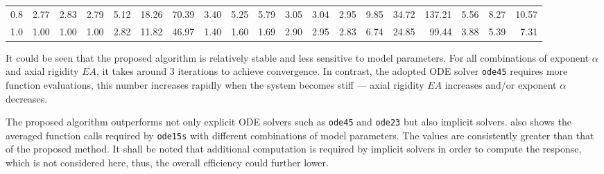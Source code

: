 \begin{table}[ht]
\begin{tabular}{rrrr|rrr|rrr|rrr|rrr|rrr}
                         0.8 &                                 2.77 &                                 2.83 &                                 2.79 &                                 5.12 &                                18.26 &                                70.39 &                                 3.40 &                                 5.25 &                                 5.79 &                                 3.05 &                                 3.04 &                                 2.95 &                                 9.85 &                                34.72 &                               137.21 &                                 5.56 &                                 8.27 &                                10.57 \\
                         1.0 &                                 1.00 &                                 1.00 &                                 1.00 &                                 2.82 &                                11.82 &                                46.97 &                                 1.40 &                                 1.60 &                                 1.69 &                                 2.90 &                                 2.95 &                                 2.83 &                                 6.74 &                                24.85 &                                99.44 &                                 3.88 &                                 5.39 &                                 7.31 \\ \bottomrule
\end{tabular}
\end{table}
It could be seen that the proposed algorithm is relatively stable and less sensitive to model parameters. For all combinations of exponent $\alpha$ and axial rigidity $EA$, it takes around \num{3} iterations to achieve convergence. In contrast, the adopted ODE solver \texttt{ode45} requires more function evaluations, this number increases rapidly when the system becomes stiff --- axial rigidity $EA$ increases and/or exponent $\alpha$ decreases.

The proposed algorithm outperforms not only explicit ODE solvers such as \texttt{ode45} and \texttt{ode23} but also implicit solvers.  also shows the averaged function calls required by \texttt{ode15s} with different combinations of model parameters. The values are consistently greater than that of the proposed method. It shall be noted that additional computation is required by implicit solvers in order to compute the response, which is not considered here, thus, the overall efficiency could further lower.
